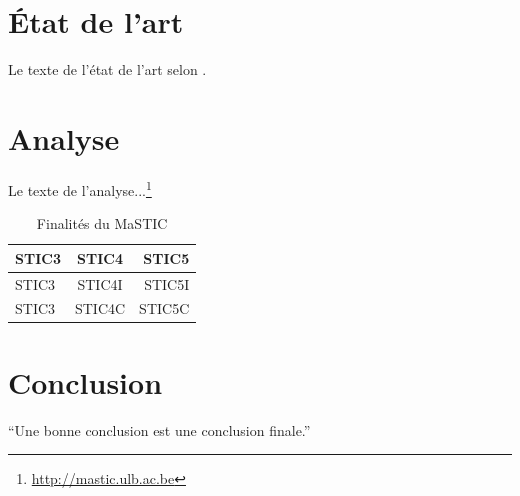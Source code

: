 \documentclass[a4paper,12pt]{article} %
\begin{document}
\section{État de l'art} %
Le texte de l'état de l'art selon \citet[p. 123]{Boy11}. %
\newpage
\section{Analyse} %
Le texte de l'analyse...\footnote{\url{http://mastic.ulb.ac.be}}

\begin{table}[h] %
  \centering %
  \begin{tabular}{|l|c|r|} %
    \hline %
    STIC3 & STIC4 & STIC5 \\ %
    \hline
    STIC3 & STIC4I & STIC5I \\
    STIC3 & STIC4C & STIC5C \\
    \hline
  \end{tabular}
  \caption{Finalités du MaSTIC}
\end{table}
\newpage
\section{Conclusion} %
\newpage
\enquote{Une bonne conclusion est une conclusion finale.} \citep{Hoo12} %

\end{document}
